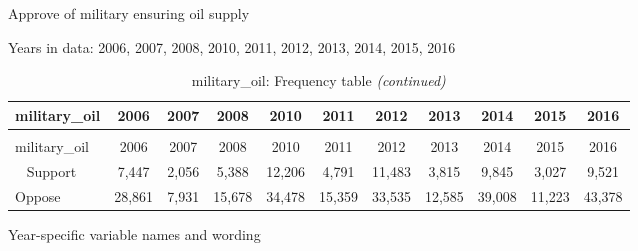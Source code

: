 \documentclass[12pt]{article}
\begin{document}
Approve of military ensuring oil supply

Years in data: 2006, 2007, 2008, 2010, 2011, 2012, 2013, 2014, 2015,
2016

\begin{longtable}[t]{lcccccccccc}
\caption{\label{tab:unnamed-chunk-4}military\_oil: Frequency table}\\
\toprule
military\_oil & 2006 & 2007 & 2008 & 2010 & 2011 & 2012 & 2013 & 2014 & 2015 & 2016\\
\midrule
\endfirsthead
\caption[]{military\_oil: Frequency table \textit{(continued)}}\\
\toprule
military\_oil & 2006 & 2007 & 2008 & 2010 & 2011 & 2012 & 2013 & 2014 & 2015 & 2016\\
\midrule
\endhead
\
\endfoot
\bottomrule
\endlastfoot
Support & 7,447 & 2,056 & 5,388 & 12,206 & 4,791 & 11,483 & 3,815 & 9,845 & 3,027 & 9,521\\
Oppose & 28,861 & 7,931 & 15,678 & 34,478 & 15,359 & 33,535 & 12,585 & 39,008 & 11,223 & 43,378\\*
\end{longtable}

Year-specific variable names and wording
\end{document}

